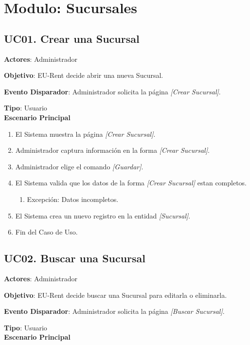 \section{Modulo: Sucursales}

\subsection{UC01. Crear una Sucursal} \label{CrearSucursal}
\textbf{Actores}: Administrador

\textbf{Objetivo}: EU-Rent decide abrir una nueva Sucursal.

\textbf{Evento Disparador}: Administrador solicita la página \textit{[Crear Sucursal]}.

\textbf{Tipo}: Usuario\\

\textbf{Escenario Principal}

\begin{enumerate}
\item El Sistema muestra la página \textit{[Crear Sucursal]}.
\item Administrador captura información en la forma \textit{[Crear Sucursal]}.
\item Administrador elige el comando \textit{[Guardar]}.
\item El Sistema valida que los datos de la forma \textit{[Crear Sucursal]} estan completos.
	\begin{enumerate}
		\item Excepción: Datos incompletos.
	\end{enumerate}
\item El Sistema crea un nuevo registro en la entidad \textit{[Sucursal]}.
\item Fin del Caso de Uso.
\end{enumerate}
\subsection{UC02. Buscar una Sucursal} \label{BuscarSucursal}
\textbf{Actores}: Administrador

\textbf{Objetivo}: EU-Rent decide buscar una Sucursal para editarla o eliminarla.

\textbf{Evento Disparador}: Administrador solicita la página \textit{[Buscar Sucursal]}.

\textbf{Tipo}: Usuario\\

\textbf{Escenario Principal}

